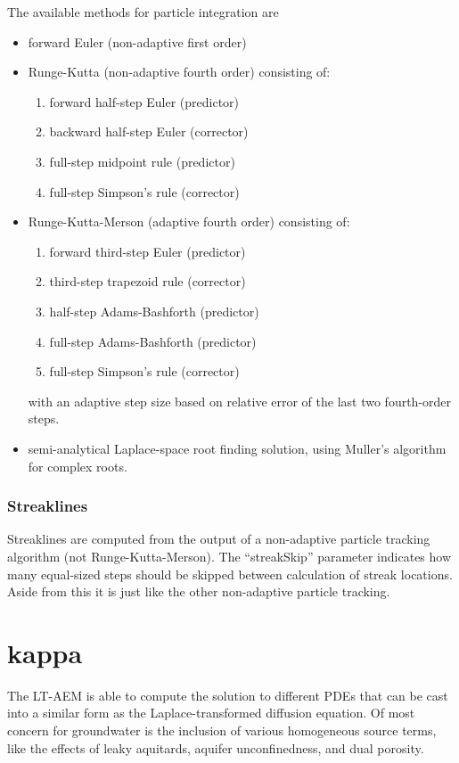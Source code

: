 \documentclass[12pt,letterpaper]{article}
\begin{document}
The available methods for particle integration are
\begin{itemize}
\item forward Euler (non-adaptive first order)
\item Runge-Kutta (non-adaptive fourth order) consisting of:
  \begin{enumerate}
  \item forward half-step Euler (predictor)
  \item backward half-step Euler (corrector)
  \item full-step midpoint rule (predictor)
  \item full-step Simpson's rule (corrector)
  \end{enumerate}
\item Runge-Kutta-Merson (adaptive fourth order) consisting of:
  \begin{enumerate}
  \item forward third-step Euler (predictor)
  \item third-step trapezoid rule (corrector)
  \item half-step Adams-Bashforth (predictor)
  \item full-step Adams-Bashforth (predictor)
  \item full-step Simpson's rule (corrector)
  \end{enumerate}
  with an adaptive step size based on relative error of the last two
  fourth-order steps.
\item semi-analytical Laplace-space root finding solution, using
  Muller's algorithm for complex roots.
\end{itemize}

\subsubsection{Streaklines}
Streaklines are computed from the output of a non-adaptive particle
tracking algorithm (not Runge-Kutta-Merson).  The ``streakSkip''
parameter indicates how many equal-sized steps should be skipped
between calculation of streak locations.  Aside from this it is just
like the other non-adaptive particle tracking.

\section{kappa}
\label{sec:kappa}

The LT-AEM is able to compute the solution to different PDEs that can
be cast into a similar form as the Laplace-transformed diffusion
equation.  Of most concern for groundwater is the inclusion of various
homogeneous source terms, like the effects of leaky aquitards, aquifer
unconfinedness, and dual porosity.
\end{document}
